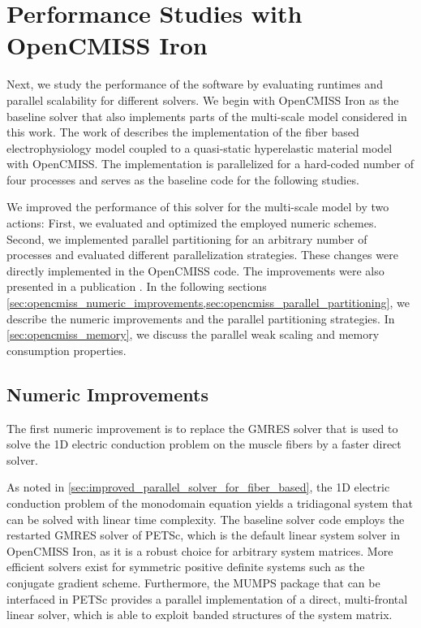 
\iffalse
\section{Performance Studies with OpenCMISS Iron}

Next, we study the performance of the software by evaluating runtimes and parallel scalability for different solvers.
We begin with OpenCMISS Iron as the baseline solver that also implements parts of the multi-scale model considered in this work. The work of \cite{Heidlauf2013} describes the implementation of the fiber based electrophysiology model coupled to a quasi-static hyperelastic material model with OpenCMISS. The implementation is parallelized for a hard-coded number of four processes and serves as the baseline code for the following studies.

We improved the performance of this solver for the multi-scale model by two actions: First, we evaluated and optimized the employed numeric schemes. Second, we implemented parallel partitioning for an arbitrary number of processes and evaluated different parallelization strategies.
These changes were directly implemented in the OpenCMISS code. The improvements were also presented in a publication \cite{Bradley:2018:EDB}. In the following sections \cref{sec:opencmiss_numeric_improvements,sec:opencmiss_parallel_partitioning}, we describe the numeric improvements and the parallel partitioning strategies. In \cref{sec:opencmiss_memory}, we discuss the parallel weak scaling and memory consumption properties.

\subsection{Numeric Improvements}\label{sec:opencmiss_numeric_improvements}

The first numeric improvement is to replace the GMRES solver that is used to solve the 1D electric conduction problem on the muscle fibers
by a faster direct solver. 

As noted in \cref{sec:improved_parallel_solver_for_fiber_based}, the 1D electric conduction problem of the monodomain equation yields a tridiagonal system that can be solved with linear time complexity. The baseline solver code employs the restarted GMRES solver of PETSc, which is the default linear system solver in OpenCMISS Iron, as it is a robust choice for arbitrary system matrices. 
More efficient solvers exist for symmetric positive definite systems such as the conjugate gradient scheme. 
Furthermore, the MUMPS package \cite{mumps2001} that can be interfaced in PETSc provides a parallel implementation of a direct, multi-frontal linear solver, which is able to exploit banded structures of the system matrix.

